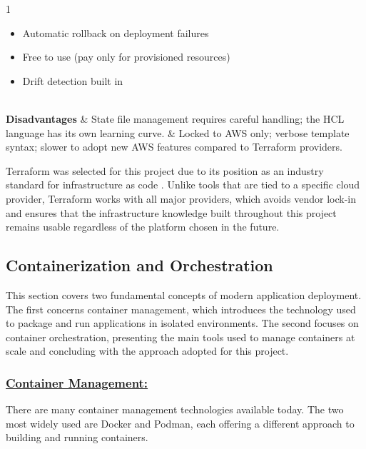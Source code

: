 \begin{table}[H]
\begin{tabularx}{1\textwidth}
\begin{itemize}[leftmargin=*, topsep=0pt, itemsep=1pt, parsep=2pt]
            \item Automatic rollback on deployment failures
            \item Free to use (pay only for provisioned resources)
            \item Drift detection built in
        \end{itemize}                                                \\
        \hline
        \textbf {Disadvantages}             & \noindent State file management requires careful handling; the HCL language has its own learning curve.                                                                                                                                                                                                        & \noindent Locked to AWS only; verbose template syntax; slower to adopt new AWS features compared to Terraform providers. \\
        \hline
    \end{tabularx}
\end{table}

Terraform was selected for this project due to its position as an industry 
standard for infrastructure as code \cite{terraform_adoption}. Unlike tools 
that are tied to a specific cloud provider, Terraform works with all major 
providers, which avoids vendor lock-in and ensures that the infrastructure 
knowledge built throughout this project remains usable regardless of the 
platform chosen in the future.

\subsection{Containerization and Orchestration}
This section covers two fundamental concepts of modern application deployment. 
The first concerns container management, which introduces the technology used 
to package and run applications in isolated environments. The second focuses 
on container orchestration, presenting the main tools used to manage containers 
at scale and concluding with the approach adopted for this project.

\subsubsection*{\underline{Container Management:}}
There are many container management technologies available today. 
The two most widely used are Docker and Podman, each offering a 
different approach to building and running containers.

